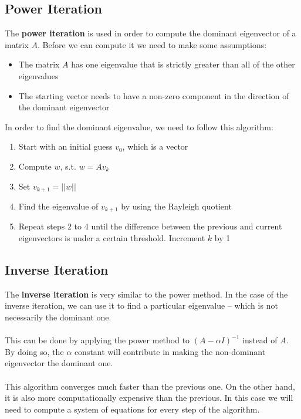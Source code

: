 \documentclass{article}
\begin{document}
\subsection{Power Iteration}
The \textbf{power iteration} is used in order to compute the dominant eigenvector of a matrix $A$. Before we can compute it we need to make some assumptions:

\begin{itemize}
	\item The matrix $A$ has one eigenvalue that is strictly greater than all of the other eigenvalues
	\item The starting vector needs to have a non-zero component in the direction of the dominant eigenvector
\end{itemize}
In order to find the dominant eigenvalue, we need to follow this algorithm:

\begin{enumerate}
	\item Start with an initial guess $v_0$, which is a vector
	\item Compute $w$, s.t. $w = Av_k$
	\item Set $v_{k+1} = ||w||$
	\item Find the eigenvalue of $v_{k+1}$ by using the Rayleigh quotient
	\item Repeat steps 2 to 4 until the difference between the previous and current eigenvectors is under a certain threshold. Increment $k$ by 1
\end{enumerate}

\subsection{Inverse Iteration}
The \textbf{inverse iteration} is very similar to the power method. In the case of the inverse iteration, we can use it to find a particular eigenvalue -- which is not necessarily the dominant one. \\ \\
This can be done by applying the power method to $(A-\alpha I)^{-1}$ instead of $A$. By doing so, the $\alpha$ constant will contribute in making the non-dominant eigenvector the dominant one. \\ \\
This algorithm converges much faster than the previous one. On the other hand, it is also more computationally expensive than the previous. In this case we will need to compute a system of equations for every step of the algorithm.
\end{document}
